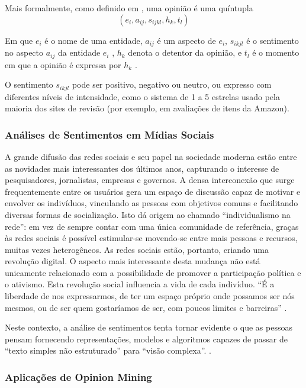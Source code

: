 \documentclass[
	12pt,				%
	openright,			%
	oneside,			%
	a4paper,			%
	english,			%
	spanish,			%
	brazil				%
	]{abntex2}
\begin{document}
Mais formalmente, como definido em \cite{bliu_2012}, uma opinião é uma quíntupla \[ \left ( e_{i}, a_{ij}, s_{ijkl},h_{k},t_{l} \right ) \]


Em que $e_{i}$ é o nome de uma entidade, $a_{ij}$ é um aspecto de $e_{i}$, $s_{ikjl}$ é o sentimento no aspecto $a_{ij}$  da entidade $e_{i}$ , $h_{k}$ denota o detentor da opinião, e $t_{l}$  é o momento em que a opinião é expressa por $h_{k}$ .

O sentimento $s_{ikjl}$ pode ser positivo, negativo ou neutro, ou expresso com diferentes níveis de intensidade, como o sistema de 1 a 5 estrelas usado pela maioria dos sites de revisão (por exemplo, em avaliações de itens da Amazon).


	\subsubsection*{Análises de Sentimentos em Mídias Sociais}
	
A grande difusão das redes sociais e seu papel na sociedade moderna estão entre as novidades mais interessantes dos últimos anos, capturando o interesse de pesquisadores, jornalistas, empresas e governos. A densa interconexão que surge frequentemente entre os usuários gera um espaço de discussão capaz de motivar e envolver os indivíduos, vinculando as pessoas com objetivos comuns e facilitando diversas formas de socialização. Isto dá origem ao chamado ``individualismo na rede'': em vez de sempre contar com uma única comunidade de referência, graças às redes sociais é possível estimular-se movendo-se entre mais pessoas e recursos, muitas vezes heterogêneos. As redes sociais estão, portanto, criando uma revolução digital. O aspecto mais interessante desta mudança não está unicamente relacionado com a possibilidade de promover a participação política e o ativismo. Esta revolução social influencia a vida de cada indivíduo. ``É a liberdade de nos expressarmos, de ter um espaço próprio onde possamos ser nós mesmos, ou de ser quem gostaríamos de ser, com poucos limites e barreiras'' \cite{book_sentiment_social}.

Neste contexto, a análise de sentimentos tenta tornar evidente o que as pessoas pensam fornecendo representações, modelos e algoritmos capazes de passar de ``texto simples não estruturado''  para ``visão complexa''. \cite{book_sentiment_social}.

	\subsubsection*{Aplicações de Opinion Mining}
	
\end{document}
